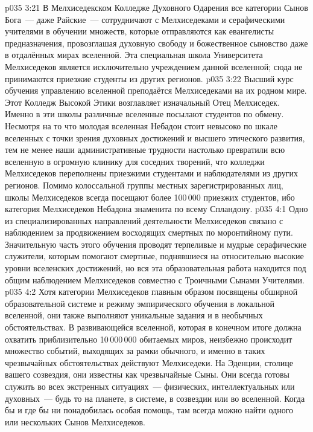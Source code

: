 \vs p035 3:21 В Мелхиседекском Колледже Духовного Одарения все категории Сынов Бога~--- даже Райские~--- сотрудничают с Мелхиседеками и серафическими учителями в обучении множеств, которые отправляются как евангелисты предназначения, провозглашая духовную свободу и божественное сыновство даже в отдалённых мирах вселенной. Эта специальная школа Университета Мелхиседеков является исключительно учреждением данной вселенной; сюда не принимаются приезжие студенты из других регионов.
\vs p035 3:22 Высший курс обучения управлению вселенной преподаётся Мелхиседеками на их родном мире. Этот Колледж Высокой Этики возглавляет изначальный Отец Мелхиседек. Именно в эти школы различные вселенные посылают студентов по обмену. Несмотря на то что молодая вселенная Небадон стоит невысоко по шкале вселенных с точки зрения духовных достижений и высшего этического развития, тем не менее наши административные трудности настолько превратили всю вселенную в огромную клинику для соседних творений, что колледжи Мелхиседеков переполнены приезжими студентами и наблюдателями из других регионов. Помимо колоссальной группы местных зарегистрированных лиц, школы Мелхиседеков всегда посещают более 100\,000 приезжих студентов, ибо категория Мелхиседеков Небадона знаменита по всему Спландону.
\vs p035 4:1 Одно из специализированных направлений деятельности Мелхиседеков связано с наблюдением за продвижением восходящих смертных по моронтийному пути. Значительную часть этого обучения проводят терпеливые и мудрые серафические служители, которым помогают смертные, поднявшиеся на относительно высокие уровни вселенских достижений, но вся эта образовательная работа находится под общим наблюдением Мелхиседеков совместно с Троичными Сынами Учителями.
\vs p035 4:2 \pc Хотя категории Мелхиседеков главным образом посвящены обширной образовательной системе и режиму эмпирического обучения в локальной вселенной, они также выполняют уникальные задания и в необычных обстоятельствах. В развивающейся вселенной, которая в конечном итоге должна охватить приблизительно 10\,000\,000 обитаемых миров, неизбежно происходит множество событий, выходящих за рамки обычного, и именно в таких чрезвычайных обстоятельствах действуют Мелхиседеки. На Эденции, столице вашего созвездия, они известны как чрезвычайные Сыны. Они всегда готовы служить во всех экстренных ситуациях~--- физических, интеллектуальных или духовных~--- будь то на планете, в системе, в созвездии или во вселенной. Когда бы и где бы ни понадобилась особая помощь, там всегда можно найти одного или нескольких Сынов Мелхиседеков.
